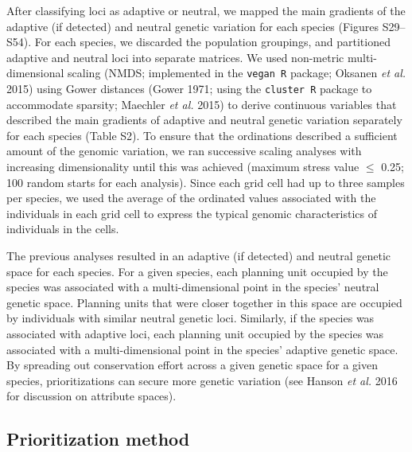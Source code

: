 \documentclass[11pt,]{article}
\begin{document}
After classifying loci as adaptive or neutral, we mapped the main
gradients of the adaptive (if detected) and neutral genetic variation
for each species (Figures S29--S54). For each species, we discarded the
population groupings, and partitioned adaptive and neutral loci into
separate matrices. We used non-metric multi-dimensional scaling (NMDS;
implemented in the \texttt{vegan R} package; Oksanen \emph{et al.} 2015)
using Gower distances (Gower 1971; using the \texttt{cluster R} package
to accommodate sparsity; Maechler \emph{et al.} 2015) to derive
continuous variables that described the main gradients of adaptive and
neutral genetic variation separately for each species (Table S2). To
ensure that the ordinations described a sufficient amount of the genomic
variation, we ran successive scaling analyses with increasing
dimensionality until this was achieved (maximum stress value \(\leq\)
0.25; 100 random starts for each analysis). Since each grid cell had up
to three samples per species, we used the average of the ordinated
values associated with the individuals in each grid cell to express the
typical genomic characteristics of individuals in the cells.

The previous analyses resulted in an adaptive (if detected) and neutral
genetic space for each species. For a given species, each planning unit
occupied by the species was associated with a multi-dimensional point in
the species' neutral genetic space. Planning units that were closer
together in this space are occupied by individuals with similar neutral
genetic loci. Similarly, if the species was associated with adaptive
loci, each planning unit occupied by the species was associated with a
multi-dimensional point in the species' adaptive genetic space. By
spreading out conservation effort across a given genetic space for a
given species, prioritizations can secure more genetic variation (see
Hanson \emph{et al.} 2016 for discussion on attribute spaces).

\subsection{Prioritization method}\label{prioritization-method}
\end{document}

